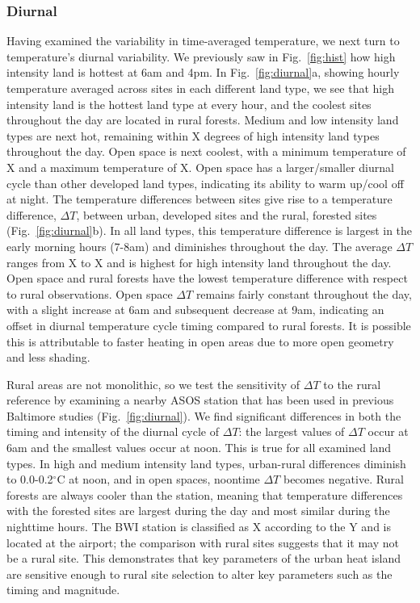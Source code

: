 \documentclass[draft,linenumbers]{agujournal}
\begin{document}
\subsubsection{Diurnal}
Having examined the variability in time-averaged temperature, we next turn to temperature's diurnal variability. We previously saw in Fig.~\ref{fig:hist} how high intensity land is hottest at 6am and 4pm.  In Fig.~\ref{fig:diurnal}a,  showing hourly temperature averaged across sites in each different land type, we see that high intensity land is the hottest land type at every hour, and the coolest sites throughout the day are located in rural forests. Medium and low intensity land types are next hot, remaining within X degrees of high intensity land types throughout the day. Open space is next coolest, with a minimum temperature of X and a maximum temperature of X. Open space has a larger/smaller diurnal cycle than other developed land types, indicating its ability to warm up/cool off at night. 
The temperature differences between sites give rise to a temperature difference, $\Delta T$, between urban, developed sites and the rural, forested sites (Fig.~\ref{fig:diurnal}b). In all land types, this temperature difference is largest in the early morning hours (7-8am) and diminishes throughout the day. The average $\Delta T$ ranges from X to X
and is highest for high intensity land throughout the day. Open space and rural forests have the lowest temperature difference with respect to rural observations. Open space $\Delta T$ remains fairly constant throughout the day, with a slight increase at 6am and subsequent decrease at 9am, indicating an offset in diurnal temperature cycle timing compared to rural forests. It is possible this is attributable to faster heating in open areas due to more open geometry and less shading. 

Rural areas are not monolithic, so we test the sensitivity of $\Delta T$ to the rural reference by examining a nearby ASOS station that has been used in previous Baltimore studies \citep{li2013synergistic} (Fig.~\ref{fig:diurnal}). We find significant differences in both the timing and intensity of the diurnal cycle of $\Delta T$: the largest values of $\Delta T$ occur at 6am and the smallest values occur at noon. This is true for all examined land types. In high and medium intensity land types, urban-rural differences diminish to 0.0-0.2$^\circ$C at noon, and in open spaces, noontime $\Delta T$ becomes negative. Rural forests are always cooler than the station, meaning that temperature differences with the forested sites are largest during the day and most similar during the nighttime hours. The BWI station is classified as X according to the Y and is located at the airport; the comparison with rural sites suggests that it may not be a rural site. This demonstrates that key parameters of the urban heat island are sensitive enough to rural site selection to alter key parameters such as the timing and magnitude. 
\end{document}

